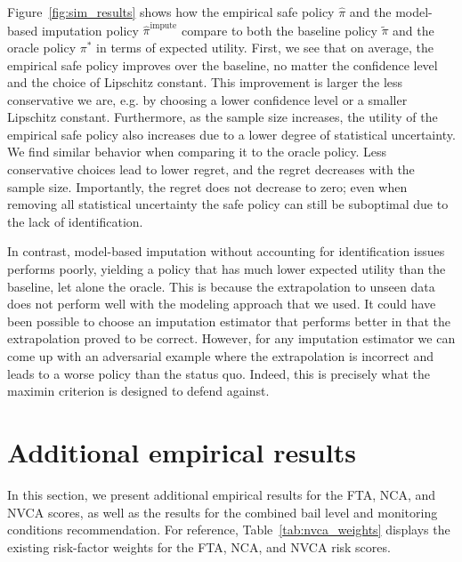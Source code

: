 \documentclass[12pt]{article}
\theoremstyle{definition}
\newcommand{\<}{\langle}
\renewcommand{\>}{\rangle}
\begin{document}
Figure~\ref{fig:sim_results} shows how the empirical safe policy $\hat{\pi}$
and the model-based imputation policy $\hat{\pi}^\text{impute}$
compare to both the baseline policy $\tilde{\pi}$ and the oracle policy
$\pi^\ast$ in terms of expected utility.
First, we see that on average, the empirical safe policy improves over the
baseline, no matter the confidence level and the choice of Lipschitz constant.
This improvement is larger the less conservative we are, e.g. by choosing a lower
confidence level or a smaller Lipschitz constant. Furthermore, as the sample size
increases, the utility of the empirical safe policy also increases due to a lower
degree of statistical uncertainty.
We find similar behavior when comparing it to the oracle policy. Less conservative
choices lead to lower regret, and the regret decreases with the sample size.
Importantly, the regret does not decrease to zero; even when removing all
statistical uncertainty the safe policy can still be suboptimal due to
the lack of identification.

In contrast, model-based imputation without accounting for identification
issues performs poorly, yielding a policy that has much 
lower expected utility than the baseline, let alone the oracle.
This is because the extrapolation to unseen data does not perform well with the modeling
approach that we used.
It could have been  possible to choose an imputation estimator
that performs better in that the extrapolation proved to be correct.
However, for any imputation estimator we can come up with an adversarial
example where the extrapolation is incorrect and leads to a worse policy than
the status quo. Indeed, this is precisely what the maximin criterion is
designed to defend against.








\section{Additional empirical results}
\label{sec:addl_results}

In this section, we present additional empirical results for the FTA, NCA, and NVCA scores, as well as the results for the combined bail level and
monitoring conditions recommendation.
For reference, Table~\ref{tab:nvca_weights} displays the existing risk-factor weights for
the FTA, NCA, and NVCA risk scores.
\end{document}

